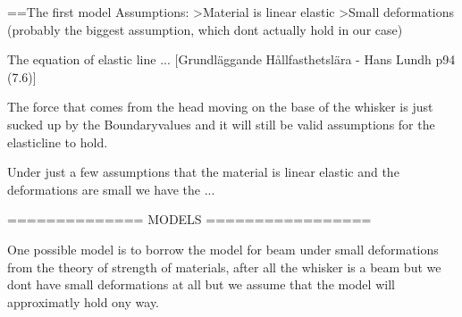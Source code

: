 ==The first model
Assumptions:
>Material is linear elastic
>Small deformations (probably the biggest assumption, which dont actually hold
in our case)

The equation of elastic line ... [Grundläggande Hållfasthetslära - Hans Lundh
p94 (7.6)]

The force that comes from the head moving on the base of the whisker is just 
sucked up by the Boundaryvalues and it will still be valid assumptions for the
elasticline to hold.

Under just a few assumptions that the material is linear elastic and the
deformations are small we have the ...


============== MODELS =================

One possible model is to borrow the model for beam under small 
deformations from the theory of strength of materials,
after all the whisker is a beam but we dont have small 
deformations at all but we assume that the model will approximatly hold ony way.


